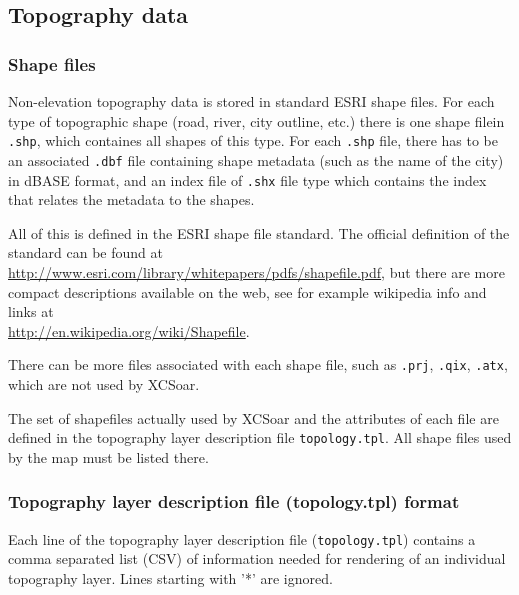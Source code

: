 \subsection{Topography data}
\subsubsection{Shape files}
Non-elevation topography data is stored in standard ESRI shape files. For each type of topographic shape (road, river, city outline, etc.) there is one shape filein \texttt{.shp}, which containes all shapes of this type. For each \texttt{.shp} file, there has to be an associated \texttt{.dbf} file containing shape metadata (such as the name of the city) in dBASE format, and an index file of \texttt{.shx} file type which contains the index that relates the metadata to the shapes. 

All of this is defined in the ESRI shape file standard. The official definition of the standard can be found at\\ \href{http://www.esri.com/library/whitepapers/pdfs/shapefile.pdf}{http://www.esri.com/library/whitepapers/pdfs/shapefile.pdf}, but there are more compact descriptions available on the web, see for example wikipedia info and links at \\ \href{http://en.wikipedia.org/wiki/Shapefile}{http://en.wikipedia.org/wiki/Shapefile}.

There can be more files associated with each shape file, such as \texttt{.prj}, \texttt{.qix}, \texttt{.atx}, which are not used by XCSoar.

The set of shapefiles actually used by XCSoar and the attributes of each file are defined in the topography layer description file \texttt{topology.tpl}. All shape files used by the map must be listed there.

\subsubsection{Topography layer description file (topology.tpl) format}

Each line of the topography layer description file (\texttt{topology.tpl}) contains
a comma separated list (CSV) of information needed for rendering of an
individual topography layer. Lines starting with '*' are ignored.


